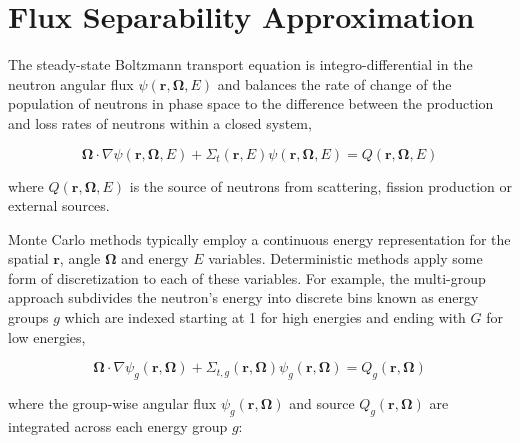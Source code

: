 \section{Flux Separability Approximation}
\label{sec:flux-separability}

The steady-state Boltzmann transport equation is integro-differential in the neutron angular flux $\psi(\mathbf{r},\mathbf{\Omega},E)$ and balances the rate of change of the population of neutrons in phase space to the difference between the production and loss rates of neutrons within a closed system,

\begin{dmath}
\label{eqn:transport-eqn-ce}
\mathbf{\Omega} \cdot \nabla \psi(\mathbf{r},\mathbf{\Omega},E) + \Sigma_{t}(\mathbf{r},E)\psi(\mathbf{r},\mathbf{\Omega},E) = Q(\mathbf{r},\mathbf{\Omega},E)
\end{dmath}


\noindent where $Q(\mathbf{r},\mathbf{\Omega},E)$ is the source of neutrons from scattering, fission production or external sources.

Monte Carlo methods typically employ a continuous energy representation for the spatial $\mathbf{r}$, angle $\mathbf{\Omega}$ and energy $E$ variables. Deterministic methods apply some form of discretization to each of these variables. For example, the multi-group approach subdivides the neutron's energy into discrete bins known as energy groups $g$ which are indexed starting at 1 for high energies and ending with $G$ for low energies,

\begin{dmath}
\label{eqn:transport-eqn-mg}
\mathbf{\Omega} \cdot \nabla \psi_{g}(\mathbf{r},\mathbf{\Omega}) + \Sigma_{t,g}(\mathbf{r},\mathbf{\Omega})\psi_{g}(\mathbf{r},\mathbf{\Omega}) = Q_{g}(\mathbf{r},\mathbf{\Omega})
\end{dmath}

\noindent where the group-wise angular flux $\psi_{g}(\mathbf{r},\mathbf{\Omega})$ and source $Q_{g}(\mathbf{r},\mathbf{\Omega})$ are integrated across each energy group $g$:

